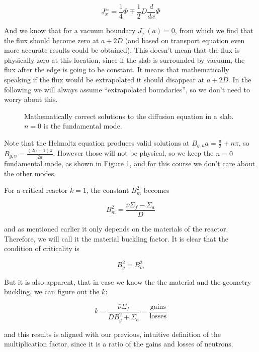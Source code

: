 \[
J_x^\pm=\frac{1}{4}\Phi\mp\frac{1}{2}D\frac{d}{dx}\Phi
\]

And we know that for a vacuum boundary $J_x^-(a)=0$, from which we find that the flux should become zero at $a+2D$ (and based on transport equation even more accurate results could be obtained). This doesn't mean that the flux is physically zero at this location, since if the slab is surrounded by vacuum, the flux after the edge is going to be constant. It means that mathematically speaking if the flux would be extrapolated it should disappear at $a+2D$. In the following we will always assume ``extrapolated boundaries'', so we don't need to worry about this.

\begin{figure}[ht!]
\protect {}\protect
\caption{\label{fig:multislab} \footnotesize{Mathematically correct solutions to the diffusion equation in a slab. $n=0$ is the fundamental mode.}}
\end{figure} 

Note that the Helmoltz equation produces valid solutions at $B_{g,n}a=\frac{\pi}{2}+n\pi$, so $B_{g,n}=\frac{(2n+1)\pi}{2a}$. However those will not be physical, so we keep the $n=0$ fundamental mode, as shown in Figure \ref{fig:multislab}, and for this course we don't care about the other modes.

For a critical reactor $k=1$, the constant $B_m^2$ becomes

$$B_m^2=\frac{\bar\nu\Sigma_f-\Sigma_a}{D}$$

\noindent and as mentioned earlier it only depends on the materials of the reactor. Therefore, we will call it the material buckling factor. It is clear that the condition of criticality is

\begin{equation}
B_g^2=B_m^2
\end{equation}

But it is also apparent, that in case we know the the material and the geometry buckling, we can figure out the $k$:

\begin{equation}
k=\frac{\bar\nu\Sigma_f}{DB_g^2+\Sigma_a}=\frac{\text{gains}}{\text{losses}}
\end{equation}

\noindent and this results is aligned with our previous, intuitive definition of the multiplication factor, since it is a ratio of the gains and losses of neutrons.

